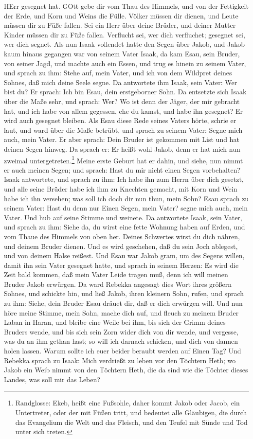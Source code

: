 HErr gesegnet hat. GOtt gebe dir vom Thau des Himmels, und von der Fettigkeit der Erde, und Korn und Weins die Fülle. Völker müssen dir dienen, und Leute müssen dir zu Füße fallen. Sei ein Herr über deine Brüder, und deiner Mutter Kinder müssen dir zu Füße fallen. Verflucht sei, wer dich verfluchet; gesegnet sei, wer dich segnet. Als nun Isaak vollendet hatte den Segen über Jakob, und Jakob kaum hinaus gegangen war von seinem Vater Isaak, da kam Esau, sein Bruder, von seiner Jagd, und machte auch ein Essen, und trug es hinein zu seinem Vater, und sprach zu ihm: Stehe auf, mein
Vater, und ich von dem Wildpret deines Sohnes, daß mich deine Seele segne. Da antwortete ihm Isaak, sein Vater: Wer bist du? Er sprach: Ich bin Esau, dein erstgeborner Sohn. Da entsetzte sich Isaak über die Maße sehr, und sprach: Wer? Wo ist denn der Jäger, der mir gebracht hat, und ich habe von allem gegessen, ehe du kamst, und habe ihn gesegnet? Er wird auch gesegnet bleiben. Als Esau diese Rede seines Vaters hörte, schrie er laut, und ward über die Maße betrübt, und sprach zu seinem Vater: Segne mich auch, mein Vater. Er aber sprach: Dein Bruder ist gekommen mit List und hat deinen Segen hinweg. Da sprach er: Er heißt wohl Jakob, denn er hat mich nun zweimal untergetreten.\footnote{Randglosse: Ekeb, heißt eine Fußsohle, daher kommt Jakob oder Jacob, ein Untertreter, oder der mit Füßen tritt, und bedeutet alle Gläubigen, die durch das Evangelium die Welt und das Fleisch, und den Teufel mit Sünde und Tod unter sich treten.} Meine erste Geburt hat er dahin, und siehe, nun nimmt er auch meinen Segen; und sprach: Hast du mir nicht einen Segen vorbehalten? Isaak antwortete, und sprach zu ihm: Ich habe ihn zum Herrn über dich gesetzt, und alle seine Brüder habe ich ihm zu Knechten gemacht, mit Korn und Wein habe ich ihn versehen; was soll ich doch dir nun thun, mein Sohn? Esau sprach zu seinem Vater: Hast du denn nur Einen Segen, mein Vater? segne mich auch, mein Vater. Und hub auf seine Stimme und weinete. Da antwortete Isaak, sein Vater, und sprach zu ihm: Siehe da, du wirst eine fette Wohnung haben auf Erden, und vom Thaue des Himmels von oben her. Deines Schwertes wirst du dich nähren, und deinem Bruder dienen. Und es wird geschehen, daß du sein Joch ablegest, und von deinem Halse reißest. Und Esau war Jakob gram, um des Segens willen, damit ihn sein Vater gesegnet hatte, und sprach in seinem Herzen: Es wird die Zeit bald kommen, daß mein Vater Leide tragen muß, denn ich will meinen Bruder Jakob erwürgen. Da ward Rebekka angesagt dies Wort ihres größern Sohnes, und schickte hin, und ließ Jakob, ihren kleinern Sohn, rufen, und sprach zu ihm: Siehe, dein Bruder Esau dräuet dir, daß er dich erwürgen will. Und nun höre meine Stimme, mein Sohn, mache dich auf, und fleuch zu meinem Bruder Laban in Haran, und bleibe eine Weile bei ihm, bis sich der Grimm deines Bruders wende, und bis sich sein Zorn wider dich von dir wende, und vergesse, was du an ihm gethan hast; so will ich darnach schicken, und dich von dannen holen lassen. Warum sollte ich euer beider beraubt werden auf Einen Tag? Und Rebekka sprach zu Isaak: Mich verdrießt zu leben vor den Töchtern Heth; wo Jakob ein Weib nimmt von den Töchtern Heth, die da sind wie die Töchter dieses Landes, was soll mir das Leben?


